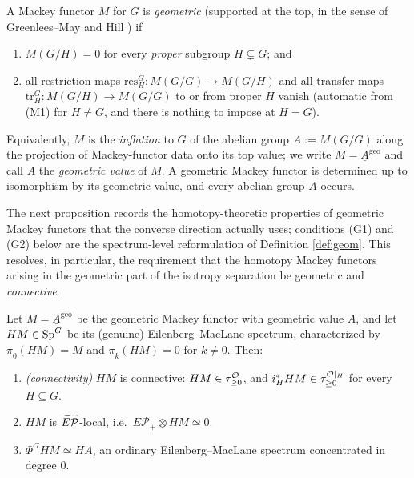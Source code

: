 \begin{qfivedefinition}\label{def:geom}
A Mackey functor $M$ for $G$ is \emph{geometric} (supported at the top, in the
sense of Greenlees--May and Hill \cite[\S6]{HillPrimer}) if
\begin{enumerate}\setlength\itemsep{2pt}
\item[(M1)] $M(G/H)=0$ for every \emph{proper} subgroup $H\subsetneq G$; and
\item[(M2)] all restriction maps $\mathrm{res}^G_H:M(G/G)\to M(G/H)$ and all
transfer maps $\mathrm{tr}^G_H:M(G/H)\to M(G/G)$ to or from proper $H$ vanish
(automatic from (M1) for $H\ne G$, and there is nothing to impose at $H=G$).
\end{enumerate}
Equivalently, $M$ is the \emph{inflation} to $G$ of the abelian group
$A:=M(G/G)$ along the projection of Mackey-functor data onto its top value; we
write $M=\underline A^{\mathrm{geo}}$ and call $A$ the \emph{geometric value} of
$M$. A geometric Mackey functor is determined up to isomorphism by its geometric
value, and every abelian group $A$ occurs.
\end{qfivedefinition}

The next proposition records the homotopy-theoretic properties of geometric
Mackey functors that the converse direction actually uses; conditions (G1) and
(G2) below are the spectrum-level reformulation of Definition \ref{def:geom}.
This resolves, in particular, the requirement that the homotopy Mackey functors
arising in the geometric part of the isotropy separation be geometric and
\emph{connective}.

\begin{qfiveproposition}\label{prop:geomEM}
Let $M=\underline A^{\mathrm{geo}}$ be the geometric Mackey functor with geometric
value $A$, and let $HM\in\mathrm{Sp}^G$ be its (genuine) Eilenberg--MacLane
spectrum, characterized by $\underline\pi_0(HM)=M$ and $\underline\pi_k(HM)=0$
for $k\ne 0$. Then:
\begin{enumerate}\setlength\itemsep{3pt}
\item[(C)] \emph{(connectivity)} $HM$ is connective: $HM\in\tau^{\mathcal{O}}_{\ge 0}$, and
$i_H^\ast HM\in\tau^{\mathcal{O}|_H}_{\ge 0}$ for every $H\subseteq G$.
\item[(G1)] $HM$ is $\widetilde{E\mathcal P}$-local, i.e.\ $E\mathcal P_+\otimes HM\simeq 0$.
\item[(G2)] $\Phi^G HM\simeq HA$, an ordinary Eilenberg--MacLane spectrum
concentrated in degree $0$.
\end{enumerate}
\end{qfiveproposition}

